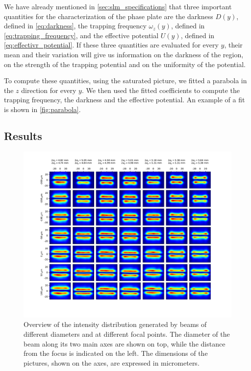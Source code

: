 We have already mentioned in \cref{sec:slm_specifications} that three important quantities for the characterization of the phase plate are the darkness $D(y)$, defined in \cref{eq:darkness}, the trapping frequency $\omega_z(y)$, defined in \cref{eq:trapping_frequency}, and the effective potential $U(y)$, defined in \cref{eq:effectivr_potential}. If these three quantities are evaluated for every $y$, their mean and their variation will give us information on the darkness of the region, on the strength of the trapping potential and on the uniformity of the potential.

To compute these quantities, using the saturated picture, we fitted a parabola in the $z$ direction for every $y$. We then used the fitted coefficients to compute the trapping frequency, the darkness and the effective potential. An example of a fit is shown in \cref{fig:parabola}.

\subsection{Results}

\begin{figure}
    \centering
    \includegraphics[width=1.3\textwidth, center]{chapters/chapter_3/figures/grid.pdf}
    \caption{Overview of the intensity distribution generated by beams of different diameters and at different focal points. The diameter of the beam along its two main axes are shown on top, while the distance from the focus is indicated on the left. The dimensions of the pictures, shown on the axes, are expressed in micrometers.}
    \label{fig:grid}
\end{figure}

